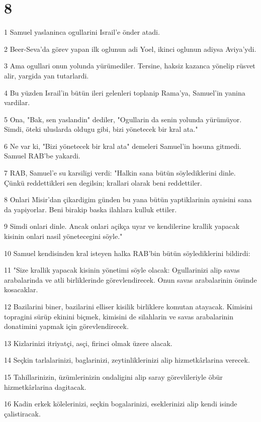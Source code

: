 \chapter{8}

\par 1 Samuel yaslaninca ogullarini Israil'e önder atadi.
\par 2 Beer-Seva'da görev yapan ilk oglunun adi Yoel, ikinci oglunun adiysa Aviya'ydi.
\par 3 Ama ogullari onun yolunda yürümediler. Tersine, haksiz kazanca yönelip rüsvet alir, yargida yan tutarlardi.
\par 4 Bu yüzden Israil'in bütün ileri gelenleri toplanip Rama'ya, Samuel'in yanina vardilar.
\par 5 Ona, "Bak, sen yaslandin" dediler, "Ogullarin da senin yolunda yürümüyor. Simdi, öteki uluslarda oldugu gibi, bizi yönetecek bir kral ata."
\par 6 Ne var ki, "Bizi yönetecek bir kral ata" demeleri Samuel'in hosuna gitmedi. Samuel RAB'be yakardi.
\par 7 RAB, Samuel'e su karsiligi verdi: "Halkin sana bütün söylediklerini dinle. Çünkü reddettikleri sen degilsin; krallari olarak beni reddettiler.
\par 8 Onlari Misir'dan çikardigim günden bu yana bütün yaptiklarinin aynisini sana da yapiyorlar. Beni birakip baska ilahlara kulluk ettiler.
\par 9 Simdi onlari dinle. Ancak onlari açikça uyar ve kendilerine krallik yapacak kisinin onlari nasil yönetecegini söyle."
\par 10 Samuel kendisinden kral isteyen halka RAB'bin bütün söylediklerini bildirdi:
\par 11 "Size krallik yapacak kisinin yönetimi söyle olacak: Ogullarinizi alip savas arabalarinda ve atli birliklerinde görevlendirecek. Onun savas arabalarinin önünde kosacaklar.
\par 12 Bazilarini biner, bazilarini elliser kisilik birliklere komutan atayacak. Kimisini topragini sürüp ekinini biçmek, kimisini de silahlarin ve savas arabalarinin donatimini yapmak için görevlendirecek.
\par 13 Kizlarinizi itriyatçi, asçi, firinci olmak üzere alacak.
\par 14 Seçkin tarlalarinizi, baglarinizi, zeytinliklerinizi alip hizmetkârlarina verecek.
\par 15 Tahillarinizin, üzümlerinizin ondaligini alip saray görevlileriyle öbür hizmetkârlarina dagitacak.
\par 16 Kadin erkek kölelerinizi, seçkin bogalarinizi, eseklerinizi alip kendi isinde çalistiracak.
